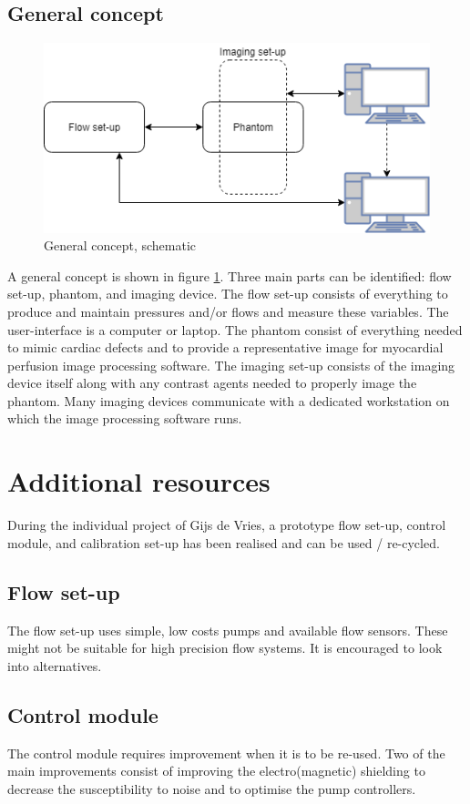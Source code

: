 \subsection{General concept}
\begin{figure}[b!]
	\begin{center}
		\includegraphics[width=0.75\linewidth]{images/global_setup.png}
	\end{center}
	\caption{General concept, schematic}
	\label{fig:general_concept}
\end{figure}
A general concept is shown in figure \ref{fig:general_concept}. Three main parts can be identified: flow set-up, phantom, and imaging device. The flow set-up consists of everything to produce and maintain pressures and/or flows and measure these variables. The user-interface is a computer or laptop. The phantom consist of everything needed to mimic cardiac defects and to provide a representative image for myocardial perfusion image processing software. The imaging set-up consists of the imaging device itself along with any contrast agents needed to properly image the phantom. Many imaging devices communicate with a dedicated workstation on which the image processing software runs.

\section{Additional resources}
During the individual project of Gijs de Vries, a prototype flow set-up, control module, and calibration set-up has been realised and can be used / re-cycled.
\subsection{Flow set-up}
The flow set-up uses simple, low costs pumps and available flow sensors. These might not be suitable for high precision flow systems. It is encouraged to look into alternatives.
\subsection{Control module}
The control module requires improvement when it is to be re-used. Two of the main improvements consist of improving the electro(magnetic) shielding to decrease the susceptibility to noise and to optimise the pump controllers.
